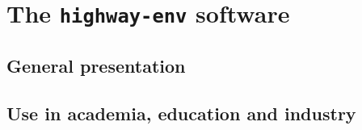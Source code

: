 
\chapter{The \texttt{highway-env} software}

\label{chapter:a}

\section{General presentation}
\section{Use in academia, education and industry}
